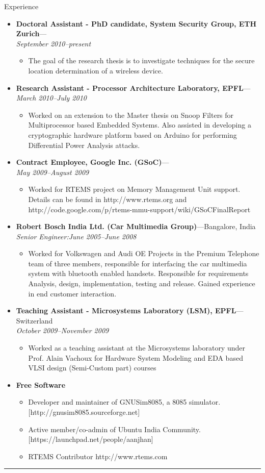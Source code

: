 \documentclass[11pt,oneside]{article}
\newenvironment{ressection}[1]{
	\vspace{4pt}
	{\fontfamily{phv}\selectfont\Large#1}
	\begin{itemize}
	\vspace{3pt}
}{
	\end{itemize}
}
\newcommand{\resitem}[1]{
	\vspace{-4pt}
	\item \begin{flushleft} #1 \end{flushleft}
}
\newcommand{\ressubitem}[1]{
	\vspace{-1pt}
	\item \begin{flushleft} #1 \end{flushleft}
}
\newcommand{\resbigitem}[3]{
	\vspace{-5pt}
	\item
	\textbf{#1}---#2 \\
	\textit{#3}
}
\newenvironment{ressubsec}[3]{
	\resbigitem{#1}{#2}{#3}
	\vspace{-2pt}
	\begin{itemize}
}{
	\end{itemize}
}
\newenvironment{reslist}[1]{
	\resitem{\textbf{#1}}
	\vspace{-5pt}
	\begin{itemize}
}{
	\end{itemize}
}
\begin{document}
\begin{ressection}{Experience}

  \begin{ressubsec}{Doctoral Assistant - PhD candidate, System Security Group,
    ETH Zurich}{}{September 2010--present}
  \ressubitem{The goal of the research thesis is to investigate techniques for
    the secure location determination of a wireless device.}
  \end{ressubsec}

      \begin{ressubsec}{Research Assistant - Processor Architecture
          Laboratory, EPFL}{}{March 2010--July 2010}
        \ressubitem{Worked on an extension to the Master thesis on Snoop
          Filters for Multiprocessor based Embedded Systems. Also assisted in
          developing a cryptographic hardware platform based on Arduino for
          performing Differential Power Analysis attacks.}
       \end{ressubsec}	

    \begin{ressubsec}{Contract Employee, Google Inc. (GSoC)}{}{May 2009--August 2009}
      \ressubitem{Worked for RTEMS project on Memory Management Unit support.
        Details can be found in http://www.rtems.org and
        http://code.google.com/p/rtems-mmu-support/wiki/GSoCFinalReport }
       \end{ressubsec}	
	
	\begin{ressubsec}{Robert Bosch India Ltd. (Car Multimedia Group)}{Bangalore, India}{Senior Engineer:June 2005--June 2008}
		\ressubitem{Worked for Volkswagen and Audi OE Projects in the Premium
      Telephone team of three members, responsible for interfacing the car
      multimedia system with bluetooth enabled handsets. Responsible for
      requirements Analysis, design, implementation, testing and release.
      Gained experience in end customer interaction.}

	\end{ressubsec}
    \newpage
    \begin{ressubsec}{Teaching Assistant - Microsystems Laboratory (LSM),
        EPFL}{Switzerland}{October 2009--November 2009}
	    \ressubitem{Worked as a teaching assistant at the Microsystems laboratory under Prof. Alain Vachoux for Hardware System Modeling and EDA based VLSI design (Semi-Custom part) courses}
	   
	\end{ressubsec}
	\begin{reslist}{Free Software}
		\ressubitem{Developer and maintainer of GNUSim8085, a 8085 simulator. [http://gnusim8085.sourceforge.net]}
		\ressubitem{Active member/co-admin of Ubuntu India Community. [https://launchpad.net/people/aanjhan]}
        \ressubitem{RTEMS Contributor http://www.rtems.com}
	\end{reslist}

\end{ressection}
\rule{\textwidth}{.5pt}
\end{document}

